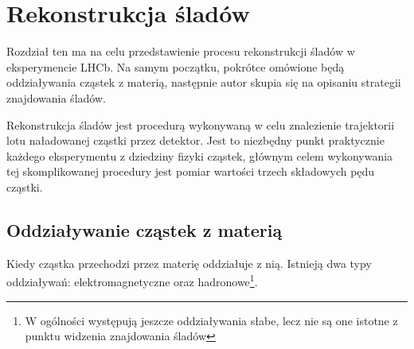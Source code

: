\chapter{Rekonstrukcja śladów}

Rozdział ten ma na celu przedstawienie procesu rekonstrukcji śladów w eksperymencie LHCb. Na samym początku, pokrótce omówione będą oddziaływania cząstek z materią, następnie autor skupia się na opisaniu strategii znajdowania śladów. 

Rekonstrukcja śladów jest procedurą wykonywaną w celu znalezienie trajektorii lotu naładowanej cząstki przez detektor. Jest to niezbędny punkt praktycznie każdego eksperymentu z dziedziny fizyki cząstek, głównym celem wykonywania tej skomplikowanej procedury jest pomiar wartości trzech składowych pędu cząstki. 

\section{Oddziaływanie cząstek z materią}
Kiedy cząstka przechodzi przez materię oddziałuje z nią. Istnieją dwa typy oddziaływań: elektromagnetyczne oraz hadronowe\footnote{W ogólności występują jeszcze oddziaływania słabe, lecz nie są one istotne z punktu widzenia znajdowania śladów}. 
